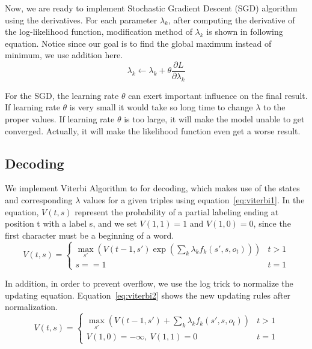 \documentclass[UTF8,11pt]{article}
\begin{document}
Now, we are ready to implement Stochastic Gradient Descent (SGD) algorithm using the derivatives. For each parameter $\lambda_k$, after computing the derivative of the log-likelihood function, modification method of $\lambda_k$ is shown in following equation. Notice since our goal is to find the global maximum instead of minimum, we use addition here.
\begin{equation} \label{eq:sgd_update}
    \lambda_k \leftarrow \lambda_k + \theta \frac{\partial L}{\partial \lambda_k}
\end{equation}

For the SGD, the learning rate $\theta$ can exert important influence on the final result. If learning rate $\theta$ is very small it would take so long time to change $\lambda$ to the proper values. If learning rate $\theta$ is too large, it will make the model unable to get converged. Actually, it will make the likelihood function even get a worse result.

\subsection{Decoding}
\noindent We implement Viterbi Algorithm to for decoding, which makes use of the states and corresponding $\lambda$ values for a given triples using equation~\ref{eq:viterbi1}. In the equation, $V(t, s)$ represent the probability of a partial labeling ending at position t with a label s, and we set $V(1, 1) = 1$ and $V(1, 0) = 0$, since the first character must be a beginning of a word.
\begin{equation} \label{eq:viterbi1}
V(t, s) = \left\{ \begin{array}{lc}
\max_{s'}( V(t-1, s') \exp \left( \sum_k \lambda_k f_k(s', s, o_t) \right) ) & t>1 \\
s==1 & t=1
\end{array} \right.
\end{equation}

In addition, in order to prevent overflow, we use the log trick to normalize the updating equation. Equation~\ref{eq:viterbi2} shows the new updating rules after normalization.
\begin{equation} \label{eq:viterbi2}
V(t, s) = \left\{ \begin{array}{lc}
\max_{s'}( V(t-1, s') + \sum_k \lambda_k f_k(s', s, o_t) ) & t>1 \\
V(1,0) = -\infty,\ V(1, 1) = 0 & t=1
\end{array} \right.
\end{equation}
\end{document}

